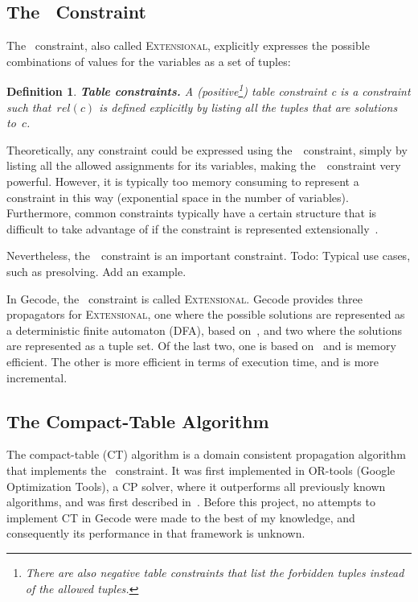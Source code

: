 \documentclass[a4paper,11pt]{article}
\newtheorem{definition}{Definition}
\newcommand{\Todo}[1]{{\color{blue}#1}}
\newcommand{\Table}{\Constraint{Table}}
\newcommand{\Extensional}{\Constraint{Extensional}~}
\def\Extensional{\textsc{Extensional}}
\newcommand{\CTpaper}[0]{DBLP:conf/cp/DemeulenaereHLP16}
\numberwithin{equation}{section}
\begin{document}



\subsection{The \Table~Constraint}
\label{bg:table}
The \Table~constraint, also called \Extensional,
explicitly expresses the possible combinations of values for the variables as a
set of tuples:

\begin{definition}
  \textbf{Table constraints.} A
  (positive\footnote{There are also negative table constraints that list the
    forbidden tuples instead of the allowed tuples.})
  \emph{table constraint c} is a
  constraint such that~$rel(c)$ is defined explicitly by listing all the
  tuples that are solutions to~$c$.
\end{definition}

Theoretically, any constraint could be expressed using the~\Table~constraint,
simply by listing all the allowed assignments for its variables, 
making the~\Table~constraint very powerful. However,
it is typically too memory consuming to represent a constraint in this way
(\Todo{exponential space} in the number of variables). Furthermore, common constraints
typically have a certain structure
that is difficult to take advantage of if the constraint is represented
extensionally~\cite{SchulteCarlsson:FDsys}.

Nevertheless, the~\Table~constraint is an important constraint.
\Todo{Todo: Typical use cases, such as presolving. Add an example.}

In Gecode, the \Table~constraint is called \Extensional. Gecode provides
three propagators for \Extensional, one where the possible solutions are
represented as a deterministic finite automaton (DFA),
based on~\cite{Pesant:seqs}, and two where the solutions
are represented as a tuple set. Of the last two, one is
based on~\cite{DBLP:journals/ai/BessiereRYZ05} and is memory efficient.
The other is more efficient in terms of execution time, and is more incremental.

\subsection{The Compact-Table Algorithm}
\label{bg:ct}
The compact-table (CT) algorithm is a domain consistent propagation algorithm
that implements the \Table~constraint. It was first implemented in
OR-tools (Google Optimization Tools), a CP solver, 
where it outperforms all previously
known algorithms, and was first described in~\cite{\CTpaper}.
Before this project, no attempts to implement CT in Gecode were made
to the best of my knowledge,
and consequently its performance in that framework is unknown.
\end{document}
